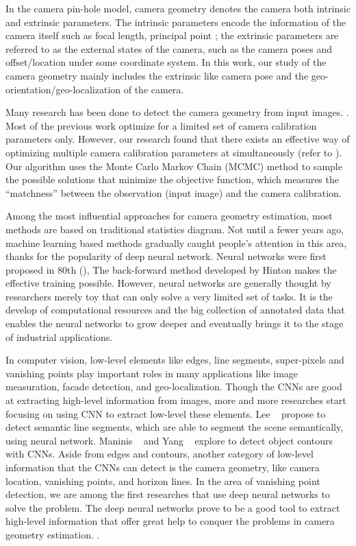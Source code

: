 In the camera pin-hole model, camera geometry denotes the camera
both intrinsic and extrinsic parameters. The intrinsic parameters
encode the information of the camera itself such as focal length,
principal point \etc; the extrinsic parameters are referred to as the
external states of the camera, such as the camera poses and
offset/location under some coordinate system. In this work, our study
of the camera geometry mainly includes the extrinsic like camera pose
and the geo-orientation/geo-localization of the camera.

Many research has been done to detect the camera
geometry from input images. . Most of the
previous work optimize for a limited set of camera calibration
parameters only. However, our research found that there exists an
effective way of optimizing multiple camera calibration parameters at
simultaneously (refer to ). Our algorithm uses the Monte
Carlo Markov Chain (MCMC) method to sample the possible solutions that
minimize the objective function, which measures the ``matchness''
between the observation (input image) and the camera calibration.

Among the most influential approaches for camera geometry estimation,
most methods are based on traditional statistics diagram. Not until a
fewer years ago, machine learning based methods gradually caught
people's attention in this area, thanks for the popularity of deep
neural network. Neural networks were first proposed in 80th
(), The back-forward method developed by Hinton
 makes the effective training possible. However, neural
networks are generally thought by researchers merely toy that can only
solve a very limited set of tasks. It is the develop of computational
resources and the big collection of annotated data that enables the
neural networks to grow deeper and eventually brings it to the stage of
industrial applications.

In computer vision, low-level elements like edges, line segments,
super-pixels and vanishing points play important roles in many
applications like image measuration, facade detection, and
geo-localization.
Though the CNNs are good at extracting high-level information from
images, more and more researches start focusing on using CNN to
extract low-level these elements.
%
Lee \etal~\cite{lee2017semantic} propose to detect semantic line
segments, which are able to segment the scene semantically, using
neural network. Maninis \etal~\cite{maninis2016convolutional} and Yang
\etal~\cite{yang2016object} explore to detect object contours with
CNNs.
%
Aside from edges and contours, another category of low-level
information that the CNNs can detect is the camera geometry, like
camera location, vanishing points, and horizon lines.
%
In the area of vanishing point detection, we are among the first
researches that use deep neural networks to solve the problem. The
deep neural networks prove to be a good tool to extract high-level
information that offer great help to conquer the problems in camera
geometry estimation. .

